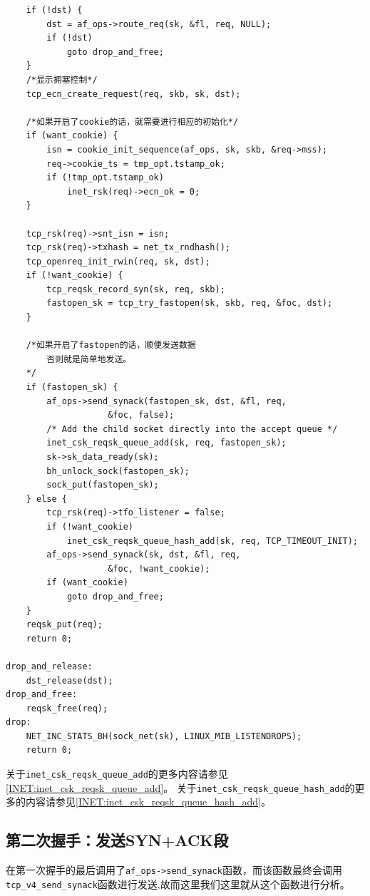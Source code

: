 \begin{verbatim}
    if (!dst) {
        dst = af_ops->route_req(sk, &fl, req, NULL);
        if (!dst)
            goto drop_and_free;
    }
	/*显示拥塞控制*/
    tcp_ecn_create_request(req, skb, sk, dst);

	/*如果开启了cookie的话，就需要进行相应的初始化*/
    if (want_cookie) {
        isn = cookie_init_sequence(af_ops, sk, skb, &req->mss);
        req->cookie_ts = tmp_opt.tstamp_ok;
        if (!tmp_opt.tstamp_ok)
            inet_rsk(req)->ecn_ok = 0;
    }

    tcp_rsk(req)->snt_isn = isn;
    tcp_rsk(req)->txhash = net_tx_rndhash();
    tcp_openreq_init_rwin(req, sk, dst);
    if (!want_cookie) {
        tcp_reqsk_record_syn(sk, req, skb);
        fastopen_sk = tcp_try_fastopen(sk, skb, req, &foc, dst);
    }

	/*如果开启了fastopen的话，顺便发送数据
		否则就是简单地发送。
	*/
    if (fastopen_sk) {
        af_ops->send_synack(fastopen_sk, dst, &fl, req,
                    &foc, false);
        /* Add the child socket directly into the accept queue */
        inet_csk_reqsk_queue_add(sk, req, fastopen_sk);
        sk->sk_data_ready(sk);
        bh_unlock_sock(fastopen_sk);
        sock_put(fastopen_sk);
    } else {
        tcp_rsk(req)->tfo_listener = false;
        if (!want_cookie)
            inet_csk_reqsk_queue_hash_add(sk, req, TCP_TIMEOUT_INIT);
        af_ops->send_synack(sk, dst, &fl, req,
                    &foc, !want_cookie);
        if (want_cookie)
            goto drop_and_free;
    }
    reqsk_put(req);
    return 0;

drop_and_release:
    dst_release(dst);
drop_and_free:
    reqsk_free(req);
drop:
    NET_INC_STATS_BH(sock_net(sk), LINUX_MIB_LISTENDROPS);
    return 0;
\end{verbatim}

			关于\texttt{inet_csk_reqsk_queue_add}的更多内容请参见\ref{INET:inet_csk_reqsk_queue_add}。
			关于\texttt{inet_csk_reqsk_queue_hash_add}的更多的内容请参见\ref{INET:inet_csk_reqsk_queue_hash_add}。


        \subsection{第二次握手：发送SYN+ACK段}
            在第一次握手的最后调用了\texttt{af_ops->send_synack}函数，而该函数最终会调用\texttt{tcp_v4_send_synack}函数进行发送,故而这里我们这里就从这个函数进行分析。
